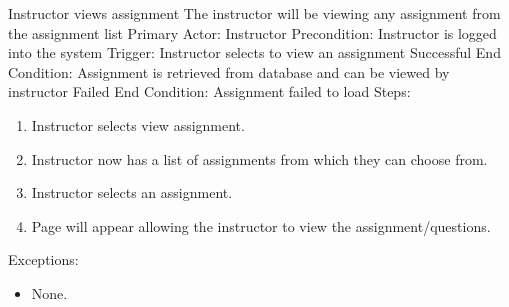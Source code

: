     \begin{section}{Instructor views assignment}
		The instructor will be viewing any assignment from the assignment list \newline
		Primary Actor: Instructor \newline
		Precondition: Instructor is logged into the system \newline
		Trigger: Instructor selects to view an assignment \newline
		Successful End Condition: Assignment is retrieved from database and can be viewed by instructor \newline
		Failed End Condition: Assignment failed to load \newline
        \newline
        Steps:
        \begin{enumerate}
            \item{Instructor selects view assignment.}
            \item{Instructor now has a list of assignments from which they can choose from.}
            \item{Instructor selects an assignment.}
            \item{Page will appear allowing the instructor to view the assignment/questions.}
        \end{enumerate}
        Exceptions:
        \begin{itemize}
            \item{None.}
        \end{itemize}
    \end{section}	
	
